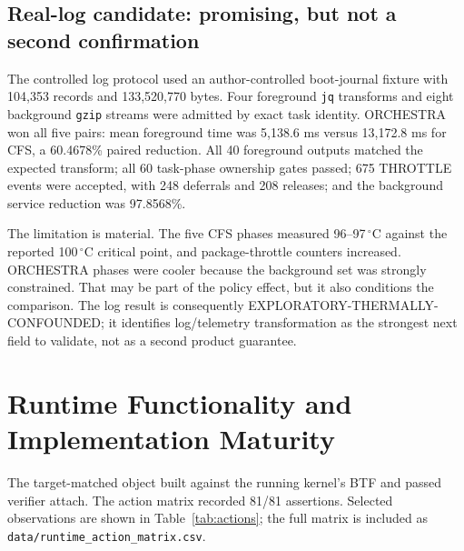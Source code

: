 \documentclass[10pt,letterpaper,twocolumn]{article}
\newcommand{\evidence}[1]{\textsf{\scriptsize #1}}
\begin{document}
\subsection{Real-log candidate: promising, but not a second confirmation}

The controlled log protocol used an author-controlled boot-journal fixture with 104,353 records and 133,520,770 bytes. Four foreground \texttt{jq} transforms and eight background \texttt{gzip} streams were admitted by exact task identity. ORCHESTRA won all five pairs: mean foreground time was 5,138.6 ms versus 13,172.8 ms for CFS, a 60.4678\% paired reduction. All 40 foreground outputs matched the expected transform; all 60 task-phase ownership gates passed; 675 THROTTLE events were accepted, with 248 deferrals and 208 releases; and the background service reduction was 97.8568\%.

The limitation is material. The five CFS phases measured 96--97\,$^\circ$C against the reported 100\,$^\circ$C critical point, and package-throttle counters increased. ORCHESTRA phases were cooler because the background set was strongly constrained. That may be part of the policy effect, but it also conditions the comparison. The log result is consequently \evidence{EXPLORATORY-THERMALLY-CONFOUNDED}; it identifies log/telemetry transformation as the strongest next field to validate, not as a second product guarantee.

\section{Runtime Functionality and Implementation Maturity}

The target-matched object built against the running kernel's BTF and passed verifier attach. The action matrix recorded 81/81 assertions. Selected observations are shown in Table~\ref{tab:actions}; the full matrix is included as \texttt{data/runtime\_action\_matrix.csv}.
\end{document}

